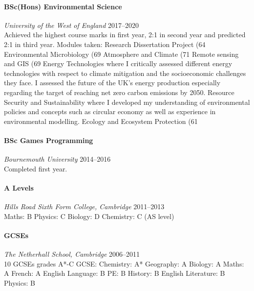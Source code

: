 \documentclass[11pt,a4paper]{article}
\newcommand{\centry}[3]{\paragraph{#1} \textit{#2}%
\hfill#3\\[2pt]}
\begin{document}
\centry{BSc(Hons) Environmental Science}{University of the West of England}{2017--2020}
 Achieved the highest course marks in first year, 2:1 in second year and predicted 2:1 in third year.
Modules taken:
Research Dissertation Project (64%
Environmental Microbiology (69%
Atmosphere and Climate (71%
Remote sensing and GIS (69%
Energy Technologies where I critically assessed different energy technologies with respect to climate mitigation and the socioeconomic challenges they face. I assessed the future of the UK’s energy production especially regarding the target of reaching net zero carbon emissions by 2050. 
Resource Security and Sustainability where I developed my understanding of environmental policies and concepts such as circular economy as well as experience in environmental modelling. 
Ecology and Ecosystem Protection (61%



\centry{BSc Games Programming}{Bournemouth University}{2014--2016} 
Completed first year.

\centry{A Levels}{Hills Road Sixth Form College, Cambridge} {2011--2013} 
Maths: B		Physics: C
Biology: D		Chemistry: C (AS level) 



\centry{GCSEs}{The Netherhall School, Cambridge}{2006--2011} 
10 GCSEs grades A*-C 
GCSE: 		
Chemistry: A*		Geography: A
Biology: A		Maths: A
French: A		English Language: B
PE: B			History: B
English Literature: B	Physics: B
\end{document}
